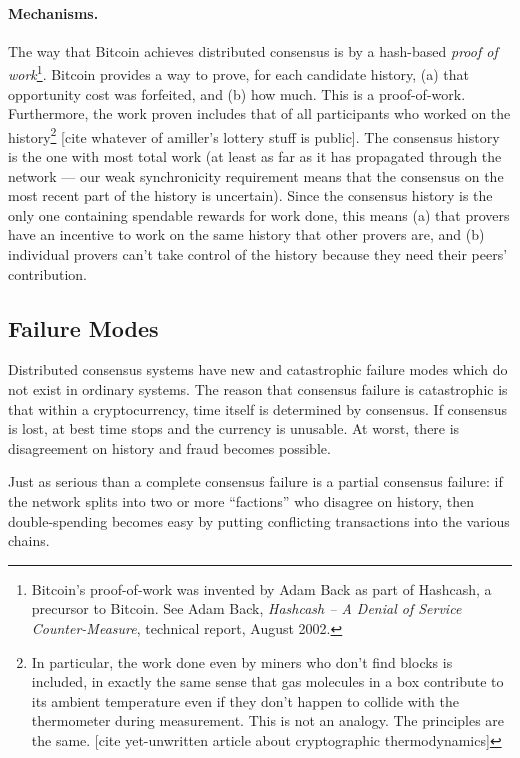 \documentclass[letterpaper]{article}
\begin{document}
\paragraph{Mechanisms.} The way that Bitcoin achieves distributed consensus is by
a hash-based \emph{proof of work}\footnote{Bitcoin's proof-of-work was invented by Adam
Back as part of Hashcash, a precursor to Bitcoin. See Adam Back, \emph{Hashcash --
A Denial of Service Counter-Measure}, technical report, August 2002.}.
Bitcoin provides a way to prove, for each candidate history, (a) that opportunity
cost was forfeited, and (b) how much. This is a proof-of-work. Furthermore, the work
proven includes that of all participants who worked on the history\footnote{In
particular, the work done even by miners who don't find blocks is included, in
exactly the same sense that gas molecules in a box contribute to its ambient
temperature even if they don't happen to collide with the thermometer during
measurement. This is not an analogy. The principles are the same. [cite yet-unwritten
article about cryptographic thermodynamics]} [cite whatever of amiller's lottery
stuff is public]. The consensus
history is the one with most total work (at least as far as it has propagated
through the network --- our weak synchronicity requirement means that the
consensus on the most recent part of the history is uncertain). Since the
consensus history is the only one containing spendable rewards for work done, this
means (a) that provers have an incentive to work on the same history that other
provers are, and (b) individual provers can't take control of the history because
they need their peers' contribution.

\subsection{Failure Modes} Distributed consensus systems have new and catastrophic
failure modes which do not exist in ordinary systems. The reason that consensus
failure is catastrophic is that within a cryptocurrency, time itself is determined
by consensus. If consensus is lost, at best time stops and the currency is unusable.
At worst, there is disagreement on history and fraud becomes possible.

Just as serious than a complete consensus failure is a partial consensus failure:
if the network splits into two or more ``factions'' who disagree on history, then
double-spending becomes easy by putting conflicting transactions into the various
chains.
\end{document}
